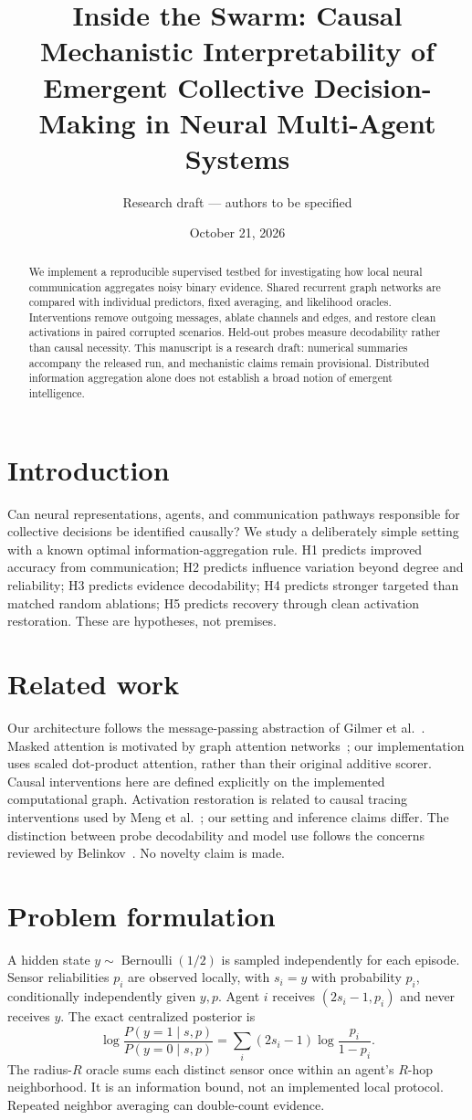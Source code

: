 \documentclass[11pt]{article}
\title{Inside the Swarm: Causal Mechanistic Interpretability of Emergent Collective Decision-Making in Neural Multi-Agent Systems}
\author{Research draft --- authors to be specified}
\date{October 21, 2026}
\begin{document}
\maketitle
\begin{abstract}
We implement a reproducible supervised testbed for investigating how local neural communication aggregates noisy binary evidence. Shared recurrent graph networks are compared with individual predictors, fixed averaging, and likelihood oracles. Interventions remove outgoing messages, ablate channels and edges, and restore clean activations in paired corrupted scenarios. Held-out probes measure decodability rather than causal necessity. This manuscript is a research draft: numerical summaries accompany the released run, and mechanistic claims remain provisional. Distributed information aggregation alone does not establish a broad notion of emergent intelligence.
\end{abstract}
\section{Introduction}
Can neural representations, agents, and communication pathways responsible for collective decisions be identified causally? We study a deliberately simple setting with a known optimal information-aggregation rule. H1 predicts improved accuracy from communication; H2 predicts influence variation beyond degree and reliability; H3 predicts evidence decodability; H4 predicts stronger targeted than matched random ablations; H5 predicts recovery through clean activation restoration. These are hypotheses, not premises.
\section{Related work}
Our architecture follows the message-passing abstraction of Gilmer et al.~\cite{gilmer}. Masked attention is motivated by graph attention networks~\cite{gat}; our implementation uses scaled dot-product attention, rather than their original additive scorer. Causal interventions here are defined explicitly on the implemented computational graph. Activation restoration is related to causal tracing interventions used by Meng et al.~\cite{meng}; our setting and inference claims differ. The distinction between probe decodability and model use follows the concerns reviewed by Belinkov~\cite{belinkov}. No novelty claim is made.
\section{Problem formulation}
A hidden state $y\sim\operatorname{Bernoulli}(1/2)$ is sampled independently for each episode. Sensor reliabilities $p_i$ are observed locally, with $s_i=y$ with probability $p_i$, conditionally independently given $y,p$. Agent $i$ receives $(2s_i-1,p_i)$ and never receives $y$. The exact centralized posterior is
\begin{equation}
\log\frac{P(y=1\mid s,p)}{P(y=0\mid s,p)}=\sum_i (2s_i-1)\log\frac{p_i}{1-p_i}.
\end{equation}
The radius-$R$ oracle sums each distinct sensor once within an agent's $R$-hop neighborhood. It is an information bound, not an implemented local protocol. Repeated neighbor averaging can double-count evidence.
\end{document}
